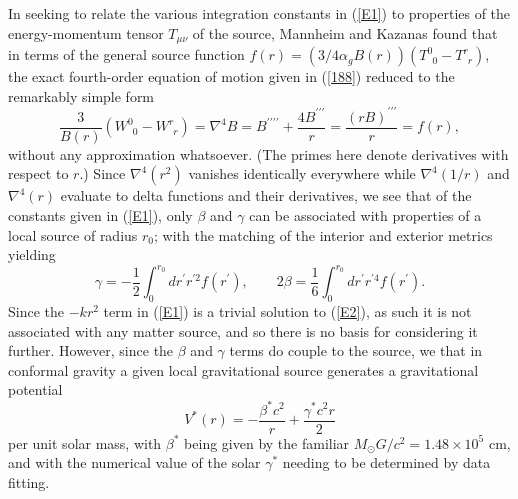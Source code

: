 \documentclass[preprint,aps]{revtex4}
\begin{document}
In seeking to relate the various integration constants in (\ref{E1}) to properties of the energy-momentum tensor $T_{\mu\nu}$ of the source, Mannheim and Kazanas found \cite{Mannheim1994} that in terms of the general source function $f(r)=(3/4\alpha_gB(r))(T^{0}_{\phantom{0}0}-T^{r}_{\phantom{r}r})$,  the exact fourth-order equation of motion given in (\ref{188}) reduced to the remarkably simple form
%
\begin{equation}
\frac{3}{B(r)}(W^{0}_{\phantom{0}0}-W^{r}_{\phantom{r}r})=\nabla^4B=B^{\prime\prime\prime\prime}+\frac{4B^{\prime\prime\prime}}{r}=
\frac{(rB)^{\prime\prime\prime}}{r}=f(r),
\label{E2}
\end{equation}
%
without any approximation whatsoever. (The primes here denote derivatives with respect to $r$.) Since $\nabla^4(r^2)$ vanishes identically everywhere while $\nabla^4(1/r)$ and $\nabla^4(r)$ evaluate to delta functions and their derivatives, we see that of the constants given in (\ref{E1}), only $\beta$ and $\gamma$ can be associated with properties of a local source of radius $r_0$; with the matching of the interior and exterior metrics yielding \cite{Mannheim1994} 
%
\begin{equation}
\gamma= -\frac{1}{2}\int_0^{r_0}dr^{\prime}r^{\prime 2}f(r^{\prime}),\qquad 
2\beta=\frac{1}{6}\int_0^{r_0}dr^{\prime}r^{\prime 4}f(r^{\prime}).
\label{E3}
\end{equation}
%
Since the $-kr^2$ term in (\ref{E1}) is a trivial solution to (\ref{E2}), as such it is not associated with any matter source, and so there is no basis for considering it further. However, since the $\beta$ and $\gamma$ terms do couple to the source, we that in conformal gravity a given local gravitational source generates a gravitational potential
%
\begin{equation}
V^{*}(r)=-\frac{\beta^{*}c^2}{r}+\frac{\gamma^{*} c^2 r}{2}
\label{E4}
\end{equation}
%
per unit solar mass, with $\beta^{*}$ being given by the familiar $M_{\odot}G/c^2=1.48\times 10^{5}$ cm, and with the numerical value of the solar $\gamma^{*}$ needing to be determined by data fitting.
\end{document}
